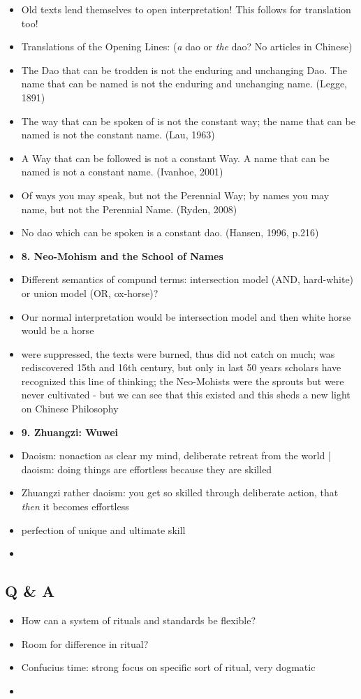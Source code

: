 \documentclass[emulatestandardclasses]{scrartcl}
\begin{document}
\begin{itemize}
  \item Old texts lend themselves to open interpretation! This follows for translation too! 
  \item Translations of the Opening Lines: (\emph{a} dao or \emph{the} dao? No articles in Chinese)
  \item The Dao that can be trodden is not the enduring and unchanging Dao. The name that can be named is not the enduring and unchanging name. (Legge, 1891)
  \item The way that can be spoken of is not the constant way; the name that can be named is not the constant name. (Lau, 1963)
  \item A Way that can be followed is not a constant Way. A name that can be named is not a constant name. (Ivanhoe, 2001)
  \item Of ways you may speak, but not the Perennial Way; by names you may name, but not the Perennial Name. (Ryden, 2008)
  \item No dao which can be spoken is a constant dao. (Hansen, 1996, p.216)
  \item \textbf{8. Neo-Mohism and the School of Names}
  \item Different semantics of compund terms: intersection model (AND, hard-white) or union model (OR, ox-horse)?
  \item Our normal interpretation would be intersection model and then white horse would be a horse
  \item were suppressed, the texts were burned, thus did not catch on much; was rediscovered 15th and 16th century, but only in last 50 years scholars have recognized this line of thinking; the Neo-Mohists were the sprouts but were never cultivated - but we can see that this existed and this sheds a new light on Chinese Philosophy
  \item \textbf{9. Zhuangzi: Wuwei}
  \item Daoism: nonaction as clear my mind, deliberate retreat from the world | daoism: doing things are effortless because they are skilled
  \item Zhuangzi rather daoism: you get so skilled through deliberate action, that \emph{then} it becomes effortless
  \item perfection of unique and ultimate skill
  \item 
\end{itemize}

\subsection{Q \& A}

\begin{itemize}
  \item How can a system of rituals and standards be flexible?
  \item Room for difference in ritual?
  \item Confucius time: strong focus on specific sort of ritual, very dogmatic
  \item 
\end{itemize}
\end{document}
